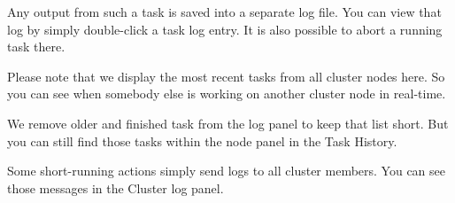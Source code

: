 Any output from such a task is saved into a separate log file. You can view that log by simply double-click a task log entry. It is also possible to abort a running task there.

Please note that we display the most recent tasks from all cluster nodes here. So you can see when somebody else is working on another cluster node in real-time.

We remove older and finished task from the log panel to keep that list short. But you can still find those tasks within the node panel in the Task History.

Some short-running actions simply send logs to all cluster members. You can see those messages in the Cluster log panel.

\begin{table}[htbp]

\centering

\begin{tabular}

\end{tabular}

\end{table}

\begin{table}[htbp]

\centering

\begin{tabular}

\end{tabular}

\end{table}

\begin{table}[htbp]

\centering

\begin{tabular}

\end{tabular}

\end{table}

\begin{table}[htbp]

\centering

\begin{tabular}

\end{tabular}

\end{table}

\begin{table}[htbp]

\centering

\begin{tabular}

\end{tabular}

\end{table}


